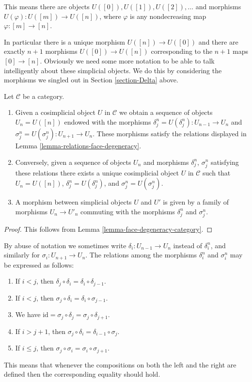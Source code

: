 \noindent
This means there are objects $U([0]), U([1]), U([2]), \ldots$
and morphisms $U(\varphi) : U([m]) \to U([n])$,
where $\varphi$ is any nondecreasing map $\varphi : [m] \to [n]$. 

\medskip\noindent
In particular there is a unique morphism $U([n]) \to U([0])$ and there are
exactly $n + 1$ morphisms $U([0]) \to U([n])$ corresponding to
the $n + 1$ maps $[0] \to [n]$. Obviously we need some more notation
to be able to talk intelligently about these simplicial objects.
We do this by considering the morphisms we singled out in
Section \ref{section-Delta} above.

\begin{lemma}
\label{lemma-characterize-cosimplicial-object}
Let $\mathcal{C}$ be a category.
\begin{enumerate}
\item Given a cosimplicial object $U$ in $\mathcal{C}$
we obtain a sequence of objects $U_n = U([n])$ endowed
with the morphisms $\delta^n_j = U(\delta^n_j) : U_{n - 1} \to U_n$ and
$\sigma^n_j = U(\sigma^n_j) : U_{n + 1} \to U_n$. These morphisms
satisfy the relations displayed in
Lemma \ref{lemma-relations-face-degeneracy}.
\item Conversely, given a sequence of objects $U_n$ and morphisms
$\delta^n_j$, $\sigma^n_j$ satisfying these relations there exists a unique
cosimplicial object $U$ in $\mathcal{C}$ such that $U_n = U([n])$,
$\delta^n_j = U(\delta^n_j)$, and $\sigma^n_j = U(\sigma^n_j)$.
\item A morphism between simplicial objects $U$ and $U'$
is given by a family of morphisms $U_n \to U'_n$ commuting
with the morphisms $\delta^n_j$ and $\sigma^n_j$.
\end{enumerate}
\end{lemma}

\begin{proof}
This follows from Lemma \ref{lemma-face-degeneracy-category}.
\end{proof}

\begin{remark}
\label{remark-relations-cosimplicial}
By abuse of notation we sometimes write $\delta_i : U_{n - 1} \to U_n$
instead of $\delta^n_i$, and similarly for $\sigma_i : U_{n + 1} \to U_n$.
The relations among the morphisms $\delta^n_i$ and $\sigma^n_i$
may be expressed as follows:
\begin{enumerate}
\item If $i < j$, then
$\delta_j \circ \delta_i = \delta_i \circ \delta_{j - 1}$.
\item If $i < j$, then
$\sigma_j \circ \delta_i = \delta_i \circ \sigma_{j - 1}$.
\item We have
$\text{id} = \sigma_j \circ \delta_j = \sigma_j \circ \delta_{j + 1}$.
\item If $i > j + 1$, then
$\sigma_j \circ \delta_i = \delta_{i - 1} \circ \sigma_j$.
\item If $i \leq j$, then
$\sigma_j \circ \sigma_i = \sigma_i \circ \sigma_{j + 1}$.
\end{enumerate}
This means that whenever the compositions on both the left and the
right are defined then the corresponding equality should hold.
\end{remark}


